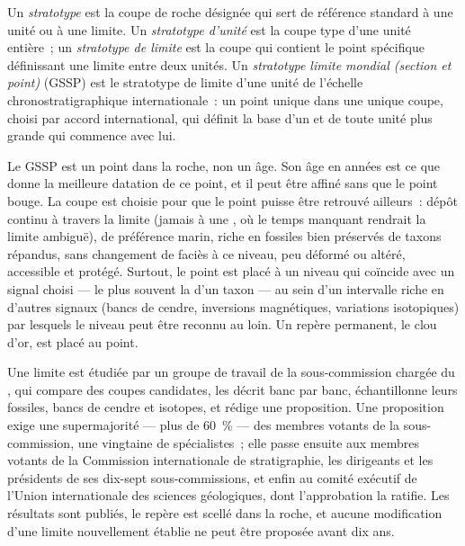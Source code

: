 \begin{definition}\label{def:b1:stratigraphic-scale:gssp}
Un \emph{stratotype} est la coupe de roche désignée qui
sert de référence standard à une unité ou à une limite. Un \emph{stratotype
d'unité} est la coupe type d'une unité entière~; un
\emph{stratotype de limite} est la coupe qui
contient le point spécifique définissant une limite entre deux unités. Un
\emph{stratotype limite mondial (section et point)} (GSSP) est le stratotype de limite d'une
unité de l'échelle chronostratigraphique internationale~: un point unique dans une unique
coupe, choisi par accord international, qui définit la base d'un 
et de toute unité plus grande qui commence avec lui.
\end{definition}

Le GSSP est un point dans la roche, non un âge. Son âge en années est ce que donne la meilleure
datation de ce point, et il peut être affiné sans que le point bouge. La
coupe est choisie pour que le point puisse être retrouvé ailleurs~: dépôt continu
à travers la limite (jamais à une , où le temps manquant rendrait
la limite ambiguë), de préférence marin, riche en fossiles bien préservés de taxons
répandus, sans changement de faciès à ce niveau, peu déformé ou
altéré, accessible et protégé. Surtout, le point est placé à un niveau
qui coïncide avec un signal choisi --- le plus souvent la  d'un
taxon --- au sein d'un intervalle riche en d'autres signaux (bancs de cendre, inversions
magnétiques, variations isotopiques) par lesquels le niveau peut être reconnu au loin. Un
repère permanent, le clou d'or, est placé au point.

\begin{inthefield}
Une limite est étudiée par un groupe de travail de la sous-commission chargée du
, qui compare des coupes candidates, les décrit banc par banc, échantillonne leurs
fossiles, bancs de cendre et isotopes, et rédige une proposition. Une proposition exige une
supermajorité --- plus de \qty{60}{\%} --- des membres votants de la
sous-commission, une vingtaine de spécialistes~; elle passe ensuite aux membres votants de la
Commission internationale de stratigraphie, les dirigeants et les
présidents de ses dix-sept sous-commissions, et enfin au comité exécutif de
l'Union internationale des sciences géologiques, dont l'approbation la ratifie. Les
résultats sont publiés, le repère est scellé dans la roche, et aucune modification d'une limite
nouvellement établie ne peut être proposée avant dix ans.
\end{inthefield}

